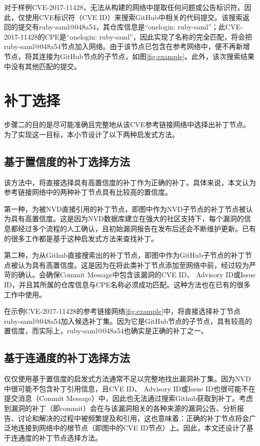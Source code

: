 \begin{exmp}
对于样例CVE-2017-11428，\tool 无法从构建的网络中提取任何问题或公告标识符。因此，\tool 仅使用CVE标识符（CVE ID）来搜索GitHub中相关的代码提交。该搜索返回的提交有ruby-saml@048a54，其仓库信息是“onelogin: ruby-saml”；此CVE-2017-11428的CPE是“onelogin: ruby-saml”，因此实现了名称的完全匹配，\tool 将会把ruby-saml@048a54节点加入网络。由于该节点已包含在参考网络中，\tool 便不再新增节点，将其连接为GitHub节点的子节点，如图\ref{fig:example}。此外，该次搜索结果中没有其他匹配的提交。
\end{exmp}   

\section{补丁选择}\label{sec:selection}

步骤二的目的是尽可能准确且完整地从该CVE参考链接网络中选择出补丁节点。 为了实现这一目标，本小节设计了以下两种启发式方法。

\subsection{基于置信度的补丁选择方法}
该方法中，\tool 将直接选择具有高置信度的补丁作为正确的补丁。具体来说，本文认为参考链接网络中的两种补丁节点具有比较高的置信度。

第一种，为被NVD直接引用的补丁节点，即图中作为NVD子节点的补丁节点被认为具有高置信度。这是因为NVD数据库建立在强大的社区支持下，每个漏洞的信息都经过多个流程的人工确认，且初始漏洞报告在发布后还会不断维护更新。已有的很多工作\cite{duan2019automating, li2016vulpecker, li2018vuldeepecker}都是基于这种启发式方法来查找补丁。

第二种，为从Github直接搜索出的补丁节点，即图中作为GitHub子节点的补丁节点被认为具有高置信度。这是因为在将此类补丁节点添加至网络中前，经过较为严苛的确认。\tool 会确保Commit Message中包含该漏洞的CVE ID、 Advisory ID或Issue ID，并且其所属的仓库信息与CPE名称必须成功匹配。这种方法也在已有的很多工作\cite{you2017semfuzz, Wang2020empirical}中使用。

\begin{exmp}
在示例CVE-2017-11428的参考链接网络\ref{fig:example}中，\tool 将直接选择补丁节点ruby-saml@048a54加入候选补丁集。因为它是GitHub节点的子节点，具有较高的置信度，而实际上，ruby-saml@048a54也确实是正确的补丁之一。
\end{exmp}

\subsection{基于连通度的补丁选择方法}
仅仅使用基于置信度的启发式方法通常不足以完整地找出漏洞补丁集。因为NVD中很可能不包含补丁引用信息，且CVE ID、 Advisory ID或Issue ID也很可能不在提交消息（Commit Message）中，因此也无法通过搜索Github获取到补丁。考虑到漏洞的补丁（即commit）会在与该漏洞相关的各种来源的漏洞公告、分析报告、讨论和解决的过程中被频繁提及和引用，这也意味着：正确的补丁节点将会广泛地连接到网络中的根节点（即图中的CVE ID节点）上。因此，本文还设计了基于连通度的补丁节点选择方法。

